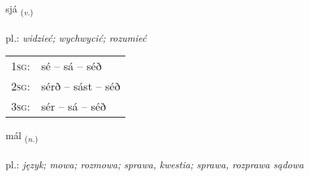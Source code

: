 \documentclass[frontgrid, backgrid]{flacards}\usepackage[]{graphicx}\usepackage[]{xcolor}
\begin{document}
\renewcommand{\blhead}{\vskip5pt {\small\bfseries\footnotesize Sagnorð | czasownik }}
\renewcommand{\bcfoot}{\vskip5pt \hspace{2pt}{\small\bfseries\footnotesize 1K}}


{sjá \small{\textsubscript{(\textit{v.})}} \\[1ex] %
\textphonetic{[sjauː]} \\
pl.: \emph{widzieć; wychwycić; rozumieć} \\  [2ex]
\renewcommand*{\arraystretch}{0.8}
\begin{tabular}{p{1cm}l}
\textsc{1sg}: & sé -- sá -- séð \\ 
\textsc{2sg}: & sérð -- sást -- séð \\ 
\textsc{3sg}: & sér -- sá -- séð \\ 
\end{tabular}
}

\renewcommand{\flhead}{\vskip5pt \fboxsep=0pt {\small\bfseries\footnotesize Nafnorð | rzeczownik}}
\renewcommand{\fcfoot}{\vskip5pt \fboxsep=0pt \hspace{2pt}{\small\bfseries\footnotesize 1K}}

\renewcommand{\blhead}{\vskip5pt {\small\bfseries\footnotesize Nafnorð | rzeczownik }}
\renewcommand{\bcfoot}{\vskip5pt \hspace{2pt}{\small\bfseries\footnotesize 1K}}


{mál \small{\textsubscript{(\textit{n.})}} \\[1ex] %
\textphonetic{[mauːl]} \\
pl.: \emph{język; mowa; rozmowa; sprawa, kwestia; sprawa, rozprawa sądowa} \\  [2ex]
\renewcommand*{\arraystretch}{0.8}
}

\renewcommand{\flhead}{\vskip5pt \fboxsep=0pt {\small\bfseries\footnotesize Atviksorð | przysłówek}}
\renewcommand{\fcfoot}{\vskip5pt \fboxsep=0pt \hspace{2pt}{\small\bfseries\footnotesize 1K}}
\end{document}
